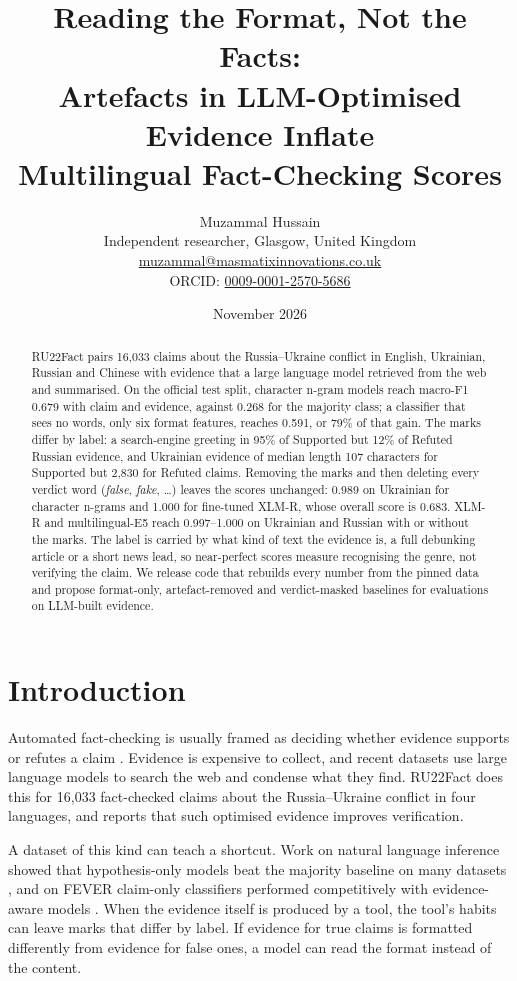 \documentclass[11pt,a4paper]{article}
\title{\textbf{Reading the Format, Not the Facts:\\Artefacts in LLM-Optimised Evidence Inflate\\Multilingual Fact-Checking Scores}}
\author{Muzammal Hussain\\
\small Independent researcher, Glasgow, United Kingdom\\
\small \href{mailto:muzammal@masmatixinnovations.co.uk}{muzammal@masmatixinnovations.co.uk}\\
\small ORCID: \href{https://orcid.org/0009-0001-2570-5686}{0009-0001-2570-5686}}
\date{\small November 2026}
\begin{document}
\maketitle

\begin{abstract}
\noindent
RU22Fact pairs 16,033 claims about the Russia--Ukraine conflict in English, Ukrainian, Russian and Chinese with
evidence that a large language model retrieved from the web and summarised. On the official test split, character n-gram
models reach macro-F1 0.679 with claim and evidence, against 0.268 for the majority class; a classifier that sees no
words, only six format features, reaches 0.591, or 79\% of that gain. The marks differ by label: a search-engine
greeting in 95\% of Supported but 12\% of Refuted Russian evidence, and Ukrainian evidence of median length 107
characters for Supported but 2,830 for Refuted claims. Removing the marks and then deleting every verdict word
(\textit{false}, \textit{fake}, \ldots) leaves the scores unchanged: 0.989 on Ukrainian for character n-grams and
1.000 for fine-tuned XLM-R, whose overall score is 0.683. XLM-R and multilingual-E5 reach 0.997--1.000 on
Ukrainian and Russian with or without the marks. The label is carried by what kind of text the evidence is, a full
debunking article or a short news lead, so near-perfect scores measure recognising the genre, not verifying the
claim. We release code that rebuilds every number from the pinned data and propose format-only, artefact-removed
and verdict-masked baselines for evaluations on LLM-built evidence.
\end{abstract}

\section{Introduction}

Automated fact-checking is usually framed as deciding whether evidence supports or refutes a claim
\citep{thorne2018fever}. Evidence is expensive to collect, and recent datasets use large language models to search the
web and condense what they find. RU22Fact \citep{zeng2024ru22fact} does this for 16,033 fact-checked claims about the
Russia--Ukraine conflict in four languages, and reports that such optimised evidence improves verification.

A dataset of this kind can teach a shortcut. Work on natural language inference showed that hypothesis-only models
beat the majority baseline on many datasets \citep{poliak2018hypothesis,gururangan2018annotation}, and on FEVER
claim-only classifiers performed competitively with evidence-aware models \citep{schuster2019debiasing}. When the
evidence itself is produced by a tool, the tool's habits can leave marks that differ by label. If evidence for true
claims is formatted differently from evidence for false ones, a model can read the format instead of the content.
\end{document}
